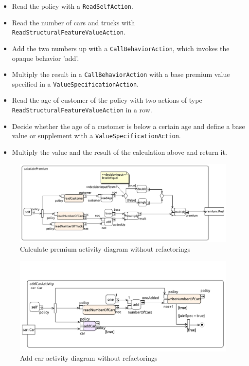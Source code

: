 \documentclass{llncs}
\begin{document}
\begin{itemize}
 \item Read the policy with a \lstinline|ReadSelfAction|.
 \item Read the number of cars and trucks with \lstinline|ReadStructuralFeatureValueAction|.
 \item Add the two numbers up with a \lstinline|CallBehaviorAction|, which invokes the opaque behavior 'add'.
 \item Multiply the result in a \lstinline|CallBehaviorAction| with a base premium value specified in a \lstinline|ValueSpecificationAction|.
 \item Read the age of customer of the policy with two actions of type \lstinline|ReadStructuralFeatureValueAction| in a row.
 \item Decide whether the age of a customer is below a certain age and define a base value or supplement with a \lstinline|ValueSpecificationAction|.
 \item Multiply the value and the result of the calculation above and return it.
\end{itemize}

\begin{figure}[h!t]
 \centering
 \includegraphics[scale=0.5]{images/insurance/Activity_calculatePremium_calculatePremium}
 \caption{Calculate premium activity diagram without refactorings}
 \label{fig:calculatePremium}
\end{figure}

\begin{figure}[ht]
 \centering
 \includegraphics[scale=0.6]{images/insurance/Activity_addCarActivity_addCarActivity}
 \caption{Add car activity diagram without refactorings}
 \label{fig:addCar}
\end{figure}
\end{document}

